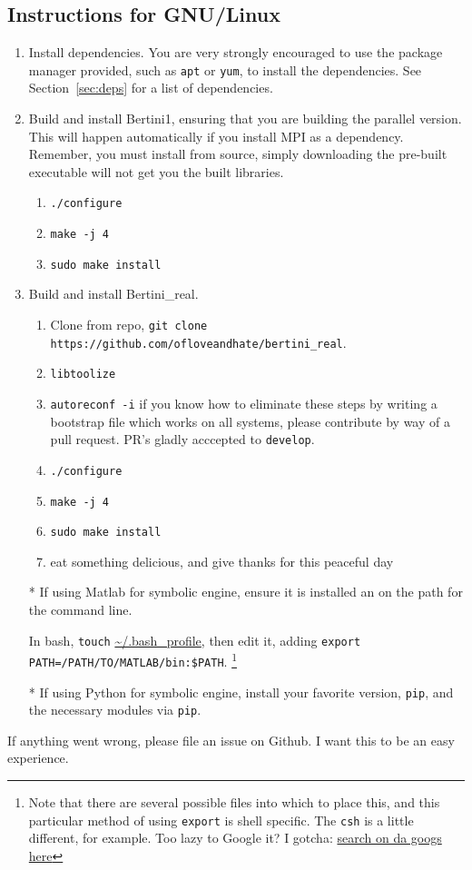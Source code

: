 
\subsection{Instructions for GNU/Linux}
\label{sec:install_linux}





\begin{enumerate}
\item Install dependencies. You are very strongly encouraged to use the package manager provided, such as {\tt apt} or {\tt yum}, to install the dependencies.  See Section~\ref{sec:deps} for a list of dependencies.
\item Build and install Bertini1, ensuring that you are building the parallel version.  This will happen automatically if you install MPI as a dependency.  Remember, you must install from source, simply downloading the pre-built executable will not get you the built libraries.
\begin{enumerate}
	\item {\tt ./configure}
	\item {\tt make -j 4}
	\item {\tt sudo make install}
\end{enumerate}
\item Build and install Bertini\_real.  
\begin{enumerate}
	\item Clone from repo, {\tt git clone https://github.com/ofloveandhate/bertini\_real}.  
	\item {\tt libtoolize}
	\item {\tt autoreconf -i} \quad if you know how to eliminate these steps by writing a bootstrap file which works on all systems, please contribute by way of a pull request.  PR's gladly acccepted to {\tt develop}.
	\item {\tt ./configure}
	\item {\tt make -j 4}
	\item {\tt sudo make install}
	\item eat something delicious, and give thanks for this peaceful day
\end{enumerate}
\item[*]
If using Matlab for symbolic engine, ensure it is installed an on the path for the command line.

In bash, {\tt touch} \url{~/.bash_profile}, then edit it, adding {\tt export PATH=/PATH/TO/MATLAB/bin:\$PATH}.%
\footnote{Note that there are several possible files into which to place this, and this particular method of using {\tt export} is shell specific.  The {\tt csh} is a little different, for example.  Too lazy to Google it?  I gotcha: \href{https://www.google.com/\#q=add+to+path+linux&*}{search on da googs here} } 

\item[*]
If using Python for symbolic engine, install your favorite version, {\tt pip}, and the necessary modules via {\tt pip}.

\end{enumerate}


If anything went wrong, please file an issue on Github.  I want this to be an easy experience.